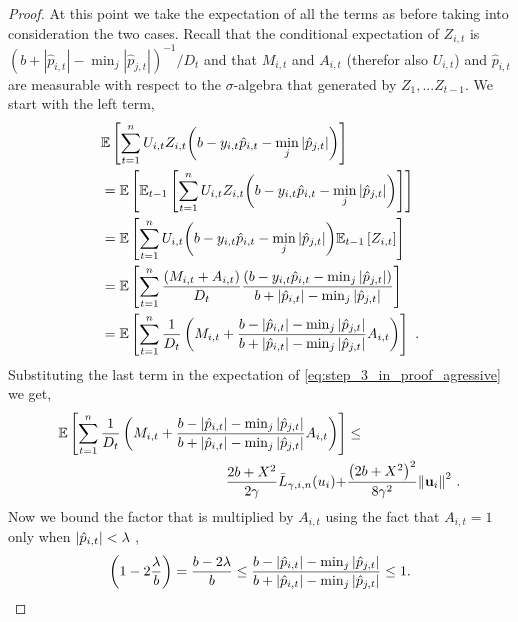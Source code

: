 {\begin{proof}
At this point we take  the expectation of all the terms as before taking into consideration the two cases.  Recall that the conditional expectation of $Z_{i,t}$ is
$(b+|\hat{p}_{i,t}|-\min_j| \hat{p}_{j,t}|)^{-1}/D_{t}$
and that $M_{i,t}$ and $A_{i,t}$ (therefor also $U_{i,t}$) and $\hat{p}_{i,t}$ are measurable with respect to the $\sigma$-algebra that generated by $Z_1,...Z_{t-1}$. 
We start with the left term,
\begin{align*}
\begin{split}
&\mathbb{E}\left[{\sum_{t=1}^{n}U_{i,t}Z_{i,t}{\left({b-y_{i,t}\hat{p}_{i,t}-\min_{j}{\left\vert{ \hat{p}_{j,t}}\right\vert}}\right)}}\right]\\
&=\mathbb{E}\left[{\mathbb{E}_{t-1}\left[{{\sum_{t=1}^{n}{U_{i,t}Z_{i,t}{\left(b-y_{i,t}\hat{p}_{i,t}-\min_{j}{\left\vert{\hat{p}_{j,t}}\right\vert}\right)}}}}\right]}\right] \\
&=\mathbb{E}\left[{{\sum_{t=1}^{n}U_{i,t}{\left({b -y_{i,t}\hat{p}_{i,t}}-\min_{j}{\left\vert \hat{p}_{j,t} \right\vert}\right)}\mathbb{E}_{t-1}\left[{ Z_{i,t}}\right]}}\right]\\
&=\mathbb{E}\left[{\sum_{t=1}^{n}\frac{\left({M_{i,t}+A_{i,t}}\right)}{D_{t}}\frac{\left({b -y_{i,t}\hat{p}_{i,t}-\min_{j}\left\vert{\hat{p}_{j,t}}\right\vert}\right)}{b+\left\vert{\hat{p}_{i,t}}\right\vert-\min_{j}{\left\vert{\hat{p}_{j,t}}\right\vert}}}\right]\\
&=\mathbb{E}\left[{\sum_{t=1}^{n}{\frac{1}{D_{t}}\left({M_{i,t}+\frac{b-\left\vert{\hat{p}_{i,t}}\right\vert-\min_{j}{\left\vert{\hat{p}_{j,t}}\right\vert }}{b+\left\vert{\hat{p}_{i,t}}\right\vert-\min_{j}{\left\vert{\hat{p}_{j,t}}\right\vert}}A_{i,t} }\right)}}\right]~.
\end{split}
\end{align*}
Substituting the last term in the expectation of
\eqref{eq:step_3_in_proof_agressive} we get,
\begin{equation}
\begin{split}
\mathbb{E}\left[ \sum_{t=1}^{n}{\frac{1}{D_{t}}}\left({M_{i,t}+\frac{b-\left\vert{\hat{p}_{i,t}}\right\vert-\min_{j}{\left\vert{\hat{p}_{j,t}}\right\vert }}{b+\left\vert{\hat{p}_{i,t}}\right\vert-\min_{j}{\left\vert{\hat{p}_{j,t}}\right\vert}}A_{i,t} }\right) \right]
&\le \\ \frac{2b+X^2}{2\gamma}{\bar
  L}_{\gamma,i,n}(u_i)+&\frac{\left({2b+X^2}\right)^2}{8{\gamma}^2}{\left\Vert
    \mathbf{u}_{i} \right\Vert}^2~.
\label{step_3_in_proof_aggressive}
\end{split}
\end{equation} 
Now we bound the factor that is multiplied by $A_{i,t}$ using the fact that $A_{i,t}=1$ only when 
$\left\vert{\hat{p}_{i,t}}\right\vert<\lambda$ ,
\begin{equation}
\label{eq:bound_on_agressive_multiplier}
\paren{1-2\frac{\lambda}{b}}=\frac{b-2\lambda}{b} \le\frac{b-\abs{\hat{p}_{i,t}}-\min_{j}{\abs{\hat{p}_{j,t}} }}{b+\abs{\hat{p}_{i,t}}-\min_{j}{\abs{\hat{p}_{j,t}}}}\le1.

\end{equation}
\end{proof}}
